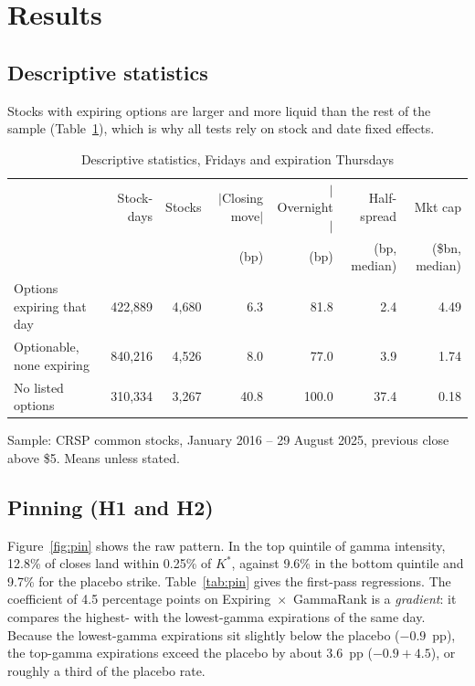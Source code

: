 \documentclass[11pt,a4paper]{article}
\newcommand{\Kstar}{K^{*}}
\begin{document}
\section{Results}

\subsection{Descriptive statistics}

Stocks with expiring options are larger and more liquid than the rest of the sample (Table~\ref{tab:desc}), which is why all tests rely on stock and date fixed effects.

\begin{table}[ht]
\centering
\begin{threeparttable}
\caption{Descriptive statistics, Fridays and expiration Thursdays}
\label{tab:desc}
\footnotesize
\setlength{\tabcolsep}{4pt}
\begin{tabular}{lrrrrrr}
\toprule
 & Stock-days & Stocks & $|$Closing move$|$ & $|$Overnight$|$ & Half-spread & Mkt cap \\
 & & & (bp) & (bp) & (bp, median) & (\$bn, median) \\
\midrule
Options expiring that day & 422,889 & 4,680 & 6.3 & 81.8 & 2.4 & 4.49 \\
Optionable, none expiring & 840,216 & 4,526 & 8.0 & 77.0 & 3.9 & 1.74 \\
No listed options & 310,334 & 3,267 & 40.8 & 100.0 & 37.4 & 0.18 \\
\bottomrule
\end{tabular}
\begin{tablenotes}\footnotesize
\item Sample: CRSP common stocks, January 2016 -- 29 August 2025, previous close above \$5. Means unless stated.
\end{tablenotes}
\end{threeparttable}
\end{table}

\subsection{Pinning (H1 and H2)}

Figure~\ref{fig:pin} shows the raw pattern. In the top quintile of gamma intensity, 12.8\% of closes land within 0.25\% of $\Kstar$, against 9.6\% in the bottom quintile and 9.7\% for the placebo strike. Table~\ref{tab:pin} gives the first-pass regressions. The coefficient of 4.5 percentage points on Expiring~$\times$~GammaRank is a \emph{gradient}: it compares the highest- with the lowest-gamma expirations of the same day. Because the lowest-gamma expirations sit slightly below the placebo ($-0.9$~pp), the top-gamma expirations exceed the placebo by about 3.6~pp ($-0.9+4.5$), or roughly a third of the placebo rate.
\end{document}

